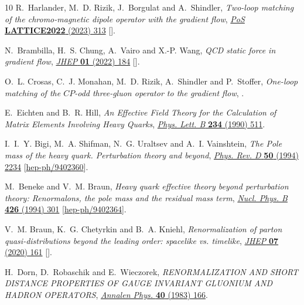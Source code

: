 \begin{thebibliography}{10}
R.~Harlander, M.~D. Rizik, J.~Borgulat and A.~Shindler, \emph{{Two-loop
  matching of the chromo-magnetic dipole operator with the gradient flow}},
  \href{https://doi.org/10.22323/1.430.0313}{\emph{PoS} {\bfseries LATTICE2022}
  (2023) 313} [\href{https://arxiv.org/abs/2212.09824}{{}}].

N.~Brambilla, H.~S. Chung, A.~Vairo and X.-P. Wang, \emph{{QCD static force in
  gradient flow}}, \href{https://doi.org/10.1007/JHEP01(2022)184}{\emph{JHEP}
  {\bfseries 01} (2022) 184}
  [\href{https://arxiv.org/abs/2111.07811}{{}}].

O.~L. Crosas, C.~J. Monahan, M.~D. Rizik, A.~Shindler and P.~Stoffer,
  \emph{{One-loop matching of the $CP$-odd three-gluon operator to the gradient
  flow}},  \href{https://arxiv.org/abs/2308.16221}{{}}.

E.~Eichten and B.~R. Hill, \emph{{An Effective Field Theory for the Calculation
  of Matrix Elements Involving Heavy Quarks}},
  \href{https://doi.org/10.1016/0370-2693(90)92049-O}{\emph{Phys. Lett. B}
  {\bfseries 234} (1990) 511}.

I.~I.~Y. Bigi, M.~A. Shifman, N.~G. Uraltsev and A.~I. Vainshtein, \emph{{The
  Pole mass of the heavy quark. Perturbation theory and beyond}},
  \href{https://doi.org/10.1103/PhysRevD.50.2234}{\emph{Phys. Rev. D}
  {\bfseries 50} (1994) 2234}
  [\href{https://arxiv.org/abs/hep-ph/9402360}{{\ttfamily hep-ph/9402360}}].

M.~Beneke and V.~M. Braun, \emph{{Heavy quark effective theory beyond
  perturbation theory: Renormalons, the pole mass and the residual mass term}},
  \href{https://doi.org/10.1016/0550-3213(94)90314-X}{\emph{Nucl. Phys. B}
  {\bfseries 426} (1994) 301}
  [\href{https://arxiv.org/abs/hep-ph/9402364}{{\ttfamily hep-ph/9402364}}].

V.~M. Braun, K.~G. Chetyrkin and B.~A. Kniehl, \emph{{Renormalization of parton
  quasi-distributions beyond the leading order: spacelike vs. timelike}},
  \href{https://doi.org/10.1007/JHEP07(2020)161}{\emph{JHEP} {\bfseries 07}
  (2020) 161} [\href{https://arxiv.org/abs/2004.01043}{{}}].

H.~Dorn, D.~Robaschik and E.~Wieczorek, \emph{{RENORMALIZATION AND SHORT
  DISTANCE PROPERTIES OF GAUGE INVARIANT GLUONIUM AND HADRON OPERATORS}},
  \href{https://doi.org/10.1002/andp.19834950208}{\emph{Annalen Phys.}
  {\bfseries 40} (1983) 166}.


\end{thebibliography}
